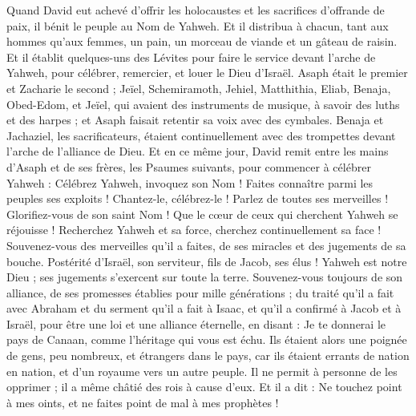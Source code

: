 \begin{multicols}{2}
Quand David eut achevé d'offrir les holocaustes et les sacrifices d’offrande de paix, il bénit le peuple au Nom de Yahweh.
Et il distribua à chacun, tant aux hommes qu'aux femmes, un pain,  un morceau de viande et un gâteau de raisin.
Et il établit quelques-uns des Lévites pour faire le service devant l’arche de Yahweh, pour célébrer, remercier, et louer le Dieu d'Israël.
Asaph était le premier et Zacharie le second ; Jeïel, Schemiramoth, Jehiel, Matthithia, Eliab, Benaja, Obed-Edom, et Jeïel, qui avaient des instruments de musique, à savoir des luths et des harpes ; et Asaph faisait retentir sa voix avec des cymbales.
Benaja et Jachaziel, les sacrificateurs, étaient continuellement avec des trompettes devant l’arche de l'alliance de Dieu.
Et en ce même jour, David remit entre les mains d'Asaph et de ses frères, les Psaumes suivants, pour commencer à célébrer Yahweh :
Célébrez Yahweh, invoquez son Nom ! Faites connaître parmi les peuples ses exploits !
Chantez-le,  célébrez-le !  Parlez de toutes ses merveilles !
Glorifiez-vous de son saint Nom !  Que le cœur de ceux qui cherchent Yahweh se réjouisse !
Recherchez Yahweh et sa force, cherchez continuellement sa face !
Souvenez-vous des merveilles qu'il a faites, de ses miracles et des jugements de sa bouche.
Postérité d'Israël, son serviteur, fils de Jacob, ses élus !
Yahweh est notre Dieu ; ses jugements s’exercent sur toute la terre.
Souvenez-vous toujours de son alliance, de ses promesses établies pour mille générations ;
du traité qu'il a fait avec Abraham et du serment qu’il a fait à Isaac,
et qu’il a confirmé à Jacob et à Israël, pour être une loi et une alliance éternelle,
en disant : Je te donnerai le pays de Canaan, comme l’héritage qui vous est échu.
Ils étaient alors une  poignée de gens, peu nombreux, et étrangers dans le pays,
car ils étaient errants de nation en nation, et d'un royaume vers un autre peuple.
Il ne permit à personne de les opprimer ; il a même châtié des rois à cause d'eux.
Et il a dit : Ne touchez point à mes oints, et ne faites point de mal à mes prophètes !

\end{multicols}
